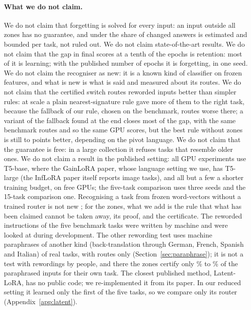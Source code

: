 \paragraph{What we do not claim.} We do not claim that forgetting is solved for every input: an
input outside all zones has no guarantee, and under \recog{} the share of changed answers is
estimated and bounded per task, not ruled out. We do not claim state-of-the-art results. We do not claim
that the gap in final scores at a tenth of the epochs is retention: most of it is learning; with the published number of epochs it is forgetting, in one seed. We do not claim the
recogniser as new: it is a known kind of classifier on frozen features, and what is new is what is
said and measured about its routes. We do not claim that the certified switch routes reworded inputs better than simpler rules: at scale a plain nearest-signature rule gave more of them to the right task, because the fallback of our rule, chosen on the benchmark, routes worse there; a variant of the fallback found at the end closes most of the gap, with the same benchmark routes and so the same GPU scores, but the best rule without zones is still \RerouteZonesCost{} to \RerouteZonesCostEs{} points better, depending on the pivot language. We do not claim that the guarantee is free: in a large
collection it refuses tasks that resemble older ones. We do not claim a result in the published setting: all
GPU experiments use T5-base, where the GainLoRA paper, whose language setting we use, has T5-large (the InfLoRA paper itself reports image tasks), and all but a few a shorter training budget,
on free GPUs; the five-task comparison uses three seeds and the 15-task comparison one. Recognising a task from frozen word-vectors without a trained
router is not new \citep{latentlora2026}; for the zones, what we add is the rule that what has been
claimed cannot be taken away, its proof, and the certificate. The reworded instructions of the five benchmark tasks were written by
machine and were looked at during development. The other rewording test
uses machine paraphrases of another kind (back-translation through German, French, Spanish and Italian) of \WidenTasksEval{} real tasks, with routes only
(Section~\ref{sec:paraphrase}); it is not a test with rewordings by people, and there the zones certify only \WidenRefTfivePLow{}\% to \WidenRefTfivePHigh{}\% of the
paraphrased inputs for their own task. The closest published method, Latent-LoRA, has no public code; we
re-implemented it from its paper. In our reduced setting it learned only the first of the five tasks,
so we compare only its router (Appendix~\ref{app:latent}).
